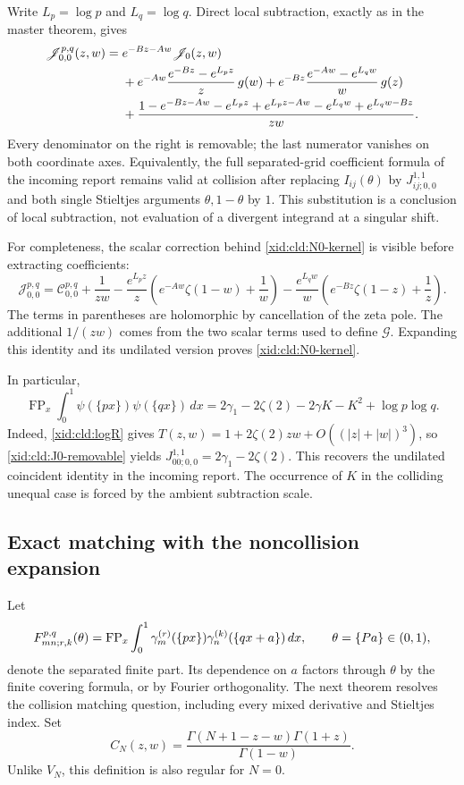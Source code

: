 Write $L_p=\log p$ and $L_q=\log q$.  Direct local subtraction, exactly
as in the master theorem, gives
\begin{align}
 \mathscr J_{0,0}^{p,q}(z,w)
 ={}&e^{-Bz-Aw}\mathscr J_0(z,w)\notag\\
 &+e^{-Aw}\frac{e^{-Bz}-e^{L_pz}}z\,g(w)
  +e^{-Bz}\frac{e^{-Aw}-e^{L_qw}}w\,g(z)\notag\\
 &+\frac{1-e^{-Bz-Aw}-e^{L_pz}+e^{L_pz-Aw}
                       -e^{L_qw}+e^{L_qw-Bz}}{zw}.
 \label{xid:cld:N0-kernel}
\end{align}
Every denominator on the right is removable; the last numerator vanishes
on both coordinate axes.  Equivalently, the full separated-grid
coefficient formula of the incoming report remains valid at collision
after replacing $I_{ij}(\theta)$ by $J_{ij;0,0}^{1,1}$ and both single
Stieltjes arguments $\theta,1-\theta$ by $1$.  This substitution is a
conclusion of local subtraction, not evaluation of a divergent integrand
at a singular shift.

For completeness, the scalar correction behind
\eqref{xid:cld:N0-kernel} is visible before extracting coefficients:
\[
 \mathscr J_{0,0}^{p,q}
 =\mathscr C_{0,0}^{p,q}+\frac1{zw}
  -\frac{e^{L_pz}}z\left(e^{-Aw}\zeta(1-w)+\frac1w\right)
  -\frac{e^{L_qw}}w\left(e^{-Bz}\zeta(1-z)+\frac1z\right).
\]
The terms in parentheses are holomorphic by cancellation of the zeta
pole.  The additional $1/(zw)$ comes from the two scalar terms used to
define $\mathscr G$.  Expanding this identity and its undilated version
proves \eqref{xid:cld:N0-kernel}.

In particular,
\begin{equation}
 \operatorname{FP}_x\int_0^1\psi(\{px\})\psi(\{qx\})\,dx
 =2\gamma_1-2\zeta(2)-2\gamma K-K^2+\log p\log q.
 \label{xid:cld:digamma}
\end{equation}
Indeed, \eqref{xid:cld:logR} gives
$T(z,w)=1+2\zeta(2)zw+O((|z|+|w|)^3)$, so
\eqref{xid:cld:J0-removable} yields $J_{00;0,0}^{1,1}=2\gamma_1-2\zeta(2)$.
This recovers the undilated coincident identity in the incoming report.
The occurrence of $K$ in the colliding unequal case is forced by the
ambient subtraction scale.

\subsection{Exact matching with the noncollision expansion}

Let
\[
 F_{mn;r,k}^{p,q}(\theta)=\operatorname{FP}_x\int_0^1
 \gamma_m^{(r)}(\{px\})\gamma_n^{(k)}(\{qx+a\})\,dx,
 \qquad \theta=\{Pa\}\in(0,1),
\]
denote the separated finite part. Its dependence on $a$ factors through
$\theta$ by the finite covering formula, or by Fourier orthogonality.  The next theorem resolves the collision
matching question, including every mixed derivative and Stieltjes index.
Set
\[
 C_N(z,w)=\frac{\Gamma(N+1-z-w)\Gamma(1+z)}{\Gamma(1-w)}.
\]
Unlike $V_N$, this definition is also regular for $N=0$.

